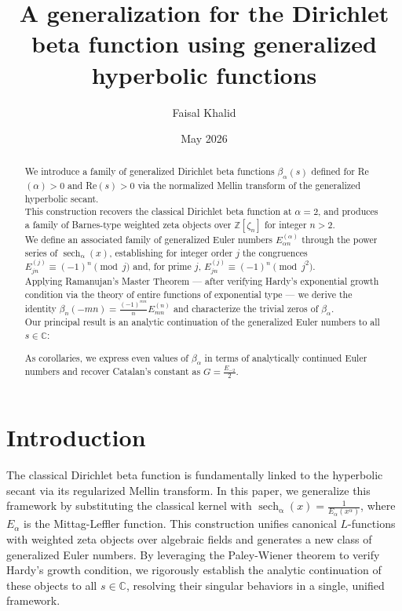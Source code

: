 \documentclass{article}
\title{A generalization for the Dirichlet beta function using generalized hyperbolic functions}
\author{Faisal Khalid}
\date{May 2026}
\DeclareMathOperator{\sech}{sech}
\newcommand{\NotDefinedsech}[2]{\operatorname{\sech_{#1}\text{#2}}}
\begin{document}
\maketitle
\begin{abstract}
We introduce a family of generalized Dirichlet beta functions $\beta_\alpha(s)$ defined for Re$(\alpha) > 0$
and Re$(s) > 0$ via the normalized Mellin transform of the generalized hyperbolic secant.\\
This construction recovers the classical Dirichlet beta function at $\alpha = 2$, and produces a family of Barnes-type weighted zeta objects over $\mathbb{Z}[\zeta_n]$ for integer $n>2$.\\
We define an associated family of generalized Euler numbers $E^{(\alpha)}_{\alpha n}$ through the power series of $\NotDefinedsech{\alpha}{}(x)$, establishing for integer order $j$ the congruences $E^{(j)}_{jn} \equiv (-1)^n \pmod{j}$ and, for prime $j$, $E^{(j)}_{jn} \equiv (-1)^n \pmod{j^2}$.\\
Applying Ramanujan's Master Theorem — after verifying Hardy's exponential growth condition via the theory of entire functions of exponential type — we derive the identity $\beta_n(-mn) = \frac{(-1)^{mn}}{n} E^{(n)}_{mn}$ and characterize the trivial zeros of $\beta_\alpha$.\\
Our principal result is an analytic continuation of the generalized Euler numbers to all $s \in \mathbb{C}$:

As corollaries, we express even values of $\beta_\alpha$ in terms of analytically continued Euler numbers and recover Catalan's constant as $G= \frac{E_{-2}}{2}$.
\end{abstract}
\section{Introduction}
The classical Dirichlet beta function is fundamentally linked to the hyperbolic secant via its regularized Mellin transform. In this paper, we generalize this framework by substituting the classical kernel with $\NotDefinedsech{\alpha}{}(x) = \frac{1}{E_\alpha(x^\alpha)}$, where $E_\alpha$ is the Mittag-Leffler function. This construction unifies canonical $L$-functions with weighted zeta objects over algebraic fields and generates a new class of generalized Euler numbers. By leveraging the Paley-Wiener theorem to verify Hardy's growth condition, we rigorously establish the analytic continuation of these objects to all $s \in \mathbb{C}$, resolving their singular behaviors in a single, unified framework.
\end{document}
